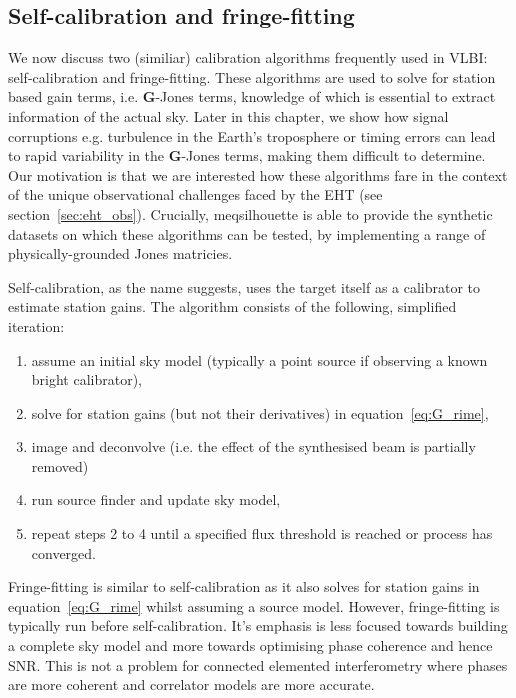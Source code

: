 \subsection{Self-calibration and fringe-fitting}\label{sec:self_cal}
We now discuss two (similiar) calibration algorithms frequently used in VLBI: self-calibration and fringe-fitting. These algorithms are used to solve for station based gain terms, i.e. $\bm G$-Jones terms, knowledge of which is essential to extract information of the actual sky. Later in this chapter, we show how signal corruptions e.g. turbulence in the Earth's troposphere or timing errors can lead to rapid variability in the $\bm G$-Jones terms, making them difficult to determine. Our motivation is that we are interested how these algorithms fare in the context of the unique observational challenges faced by the EHT (see section~\ref{sec:eht_obs}). Crucially, {\sc meqsilhouette} is able to provide the synthetic datasets on which these algorithms can be tested, by implementing a range of physically-grounded Jones matricies. 


Self-calibration, as the name suggests, uses the target itself as a calibrator to estimate station gains.
The algorithm consists of the following, simplified iteration:
\begin{enumerate}
 \item assume an initial sky model (typically a point source if observing a known bright calibrator),
 \item solve for station gains (but not their derivatives) in equation~\ref{eq:G_rime},
 \item image and deconvolve (i.e. the effect of the synthesised beam is partially removed)
 \item run source finder and update sky model,
 \item repeat steps 2 to 4 until a specified flux threshold is reached or process has converged.
\end{enumerate}



Fringe-fitting is similar to self-calibration as it also solves for station gains in equation~\ref{eq:G_rime} whilst assuming a source model. However, fringe-fitting is typically run before self-calibration. It's emphasis is less focused towards building a complete sky model and more towards optimising phase coherence and hence SNR. This is not a problem for connected elemented interferometry where phases are more coherent and correlator models are more accurate. 



